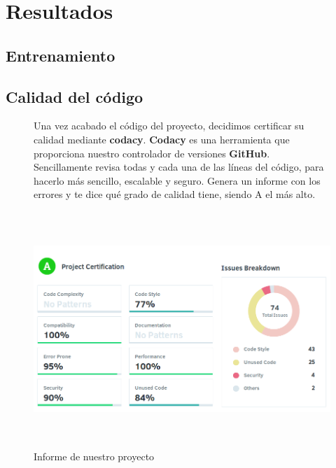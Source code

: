 \cleardoublepage

\chapter{Resultados}
\label{makereference7}

\section{Entrenamiento}

\section{Calidad del código}

\begin{figure}[htb]
	Una vez acabado el código del proyecto, decidimos certificar su calidad mediante \textbf{codacy}.
	\textbf{Codacy} es una herramienta que proporciona nuestro controlador de versiones \textbf{GitHub}. Sencillamente revisa todas y cada una de las líneas del código, para hacerlo más sencillo, escalable y seguro. Genera un informe con los errores y te dice qué grado de calidad tiene, siendo A el más alto.
	
	\begin{center}
		\includegraphics[height=3.5in]{figures/codacy.png}
		\caption{Informe de nuestro proyecto}
	\end{center}
	
	\label{figure7}
\end{figure}